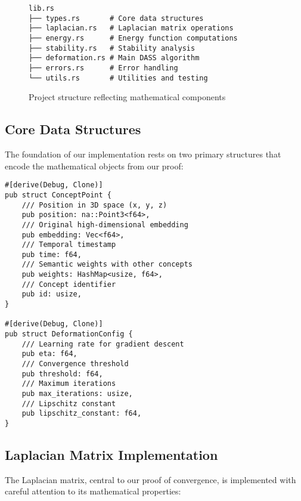 \documentclass{article}
\begin{document}
\begin{figure}[h]
\centering
\begin{verbatim}
lib.rs
├── types.rs       # Core data structures
├── laplacian.rs   # Laplacian matrix operations
├── energy.rs      # Energy function computations
├── stability.rs   # Stability analysis
├── deformation.rs # Main DASS algorithm
├── errors.rs      # Error handling
└── utils.rs       # Utilities and testing
\end{verbatim}
\caption{Project structure reflecting mathematical components}
\end{figure}

\subsection{Core Data Structures}
The foundation of our implementation rests on two primary structures that encode the mathematical objects from our proof:

\begin{verbatim}
#[derive(Debug, Clone)]
pub struct ConceptPoint {
    /// Position in 3D space (x, y, z)
    pub position: na::Point3<f64>,
    /// Original high-dimensional embedding
    pub embedding: Vec<f64>,
    /// Temporal timestamp
    pub time: f64,
    /// Semantic weights with other concepts
    pub weights: HashMap<usize, f64>,
    /// Concept identifier
    pub id: usize,
}

#[derive(Debug, Clone)]
pub struct DeformationConfig {
    /// Learning rate for gradient descent
    pub eta: f64,
    /// Convergence threshold
    pub threshold: f64,
    /// Maximum iterations
    pub max_iterations: usize,
    /// Lipschitz constant
    pub lipschitz_constant: f64,
}
\end{verbatim}

\subsection{Laplacian Matrix Implementation}
The Laplacian matrix, central to our proof of convergence, is implemented with careful attention to its mathematical properties:
\end{document}
